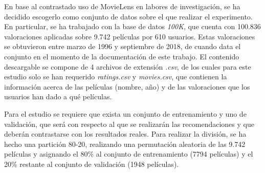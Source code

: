 En base al contrastado uso de MovieLens en labores de investigación, se ha decidido escogerlo como conjunto de datos sobre el que realizar el experimento. En particular, se ha trabajado con la base de datos \textit{100K}, que cuenta con 100.836 valoraciones aplicadas sobre 9.742 películas por 610 usuarios. Estas valoraciones se obtuvieron entre marzo de 1996 y septiembre de 2018, de cuando data el conjunto en el momento de la documentación de este trabajo. El contenido descargable se compone de 4 archivos de extensión \textit{.csv}, de los cuales para este estudio solo se han requerido \textit{ratings.csv} y \textit{movies.csv}, que contienen la información acerca de las películas (nombre, año) y de las valoraciones que los usuarios han dado a qué películas.

Para el estudio se requiere que exista un conjunto de entrenamiento y uno de validación, que será con respecto al que se realizarán las recomendaciones y que deberán contrastarse con los resultados reales. Para realizar la división, se ha hecho una partición 80-20, realizando una permutación aleatoria de las 9.742 películas y asignando el 80\% al conjunto de entrenamiento (7794 películas) y el 20\% restante al conjunto de validación (1948 películas).